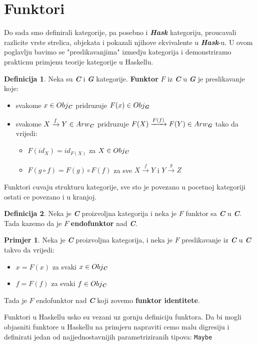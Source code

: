 \documentclass[11pt]{article}
\newcommand{\category}[1]{\textbf{\emph{#1}}}
\newcommand{\codei}[1]{
  {\lstinline[basicstyle=\ttfamily]{#1}}
}
\theoremstyle{definition}
\newtheorem{definition}{Definicija}
\newtheorem{primjer}{Primjer}
\begin{document}
  \section{Funktori}
  Do sada smo definirali kategorije, pa posebno i \category{Hask} kategoriju,
  proucavali razlicite vrste strelica, objekata i pokazali njihove ekvivalente
  u \category{Hask}-u. U ovom poglavlju bavimo se "preslikavanjima" izmedju
  kategorija i demonstriramo prakticnu primjenu teorije kategorije u Haskellu.
  \begin{definition}
    Neka su \category{C} i \category{G} kategorije. \textbf{Funktor} $F$ iz
    \category{C} u \category{G} je preslikavanje koje:
    \begin{itemize}
      \item svakome $x \in Obj_\category{C}$ pridruzuje $F(x) \in
        Obj_\category{G}$
      \item svakome $X \xrightarrow{f} Y \in Arw_\category{C}$ pridruzuje
        $F(X) \xrightarrow{F(f)} F(Y) \in Arw_\category{G}$ tako da vrijedi:
        \begin{itemize}
          \item $F(id_X) = id_{F(X)}$ za $X \in Obj_\category{C}$
          \item $F(g \circ f) = F(g) \circ F(f)$ za sve $X \xrightarrow{f} Y$ i
            $Y \xrightarrow{g} Z$
        \end{itemize}
    \end{itemize}
  \end{definition}
  Funktori cuvaju strukturu kategorije, sve sto je povezano u pocetnoj
  kategoriji ostati ce povezano i u kranjoj.
  \begin{definition}
    Neka je \category{C} proizvoljna kategorija i neka je $F$ funktor sa
    \category{C} u \category{C}. Tada kazemo da je $F$ \textbf{endofunktor} nad
    \category{C}.
  \end{definition}
  \begin{primjer}
    Neka je \category{C} proizvoljna kategorija, i neka je $F$ preslikavanje
    iz \category{C}  u \category{C} takvo da vrijedi:
    \begin{itemize}
      \item $x = F(x)$ za svaki $x \in Obj_\category{C}$
      \item $f = F(f)$ za svaki $f \in Obj_\category{C}$
    \end{itemize}
    Tada je $F$ endofunktor nad \category{C} koji zovemo \textbf{funktor identitete}.
  \end{primjer}
  Funktori u Haskellu usko su vezani uz gornju definiciju funktora. 
  Da bi mogli objasniti
  funktore u Haskellu na primjeru napraviti cemo malu digresiju i definirati
  jedan od najjednostavnijih parametriziranih tipova: \codei{Maybe}
\end{document}
